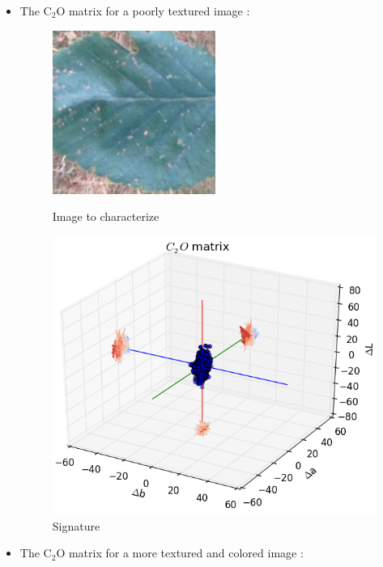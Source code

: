 \documentclass[xcolor=table]{beamer}
\begin{document}
\begin{frame}
\begin{itemize}
\item<1-> The C$_2$O matrix for a poorly textured image :
 {\begin{figure}[htbp]
    \begin{minipage}[c]{.40\linewidth}
      \begin{center}
    \includegraphics[scale=1.0]{61p.jpg}
    \caption{Image to characterize}
    \label{fig:Sig}
      \end{center}
    \end{minipage}
    \hfill
    \begin{minipage}[c]{.55\linewidth}
      \begin{center}
    \includegraphics[scale=0.38]{C2OMat61p.png}
    \caption{Signature}
    \label{fig:Sig}
      \end{center}
    \end{minipage}
\end{figure}}
\item<2-> The C$_2$O matrix for a more textured and colored image :

\end{itemize}
\end{frame}
\end{document}
